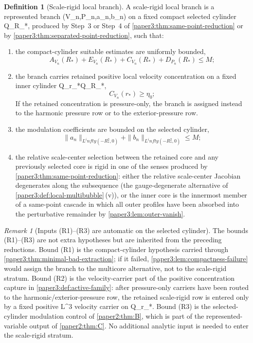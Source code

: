\documentclass[11pt]{amsart}
\def\({}%
\def\){}%
\def\infty{infty}%
\theoremstyle{plain}
\theoremstyle{definition}
\newtheorem{definition}[definition]{Definition}
\theoremstyle{remark}
\newtheorem{remark}[remark]{Remark}
\begin{document}
\begin{definition}[Scale-rigid local branch]
\label{paper3:def:scale-rigid-branch}
A scale-rigid local branch is a represented branch
\((V_n,P_n,a_n,b_n)\) on a fixed compact selected cylinder \(Q_{R_*}\),
produced by Step~3 or Step~4 of \cref{paper3:thm:same-point-reduction} or by
\cref{paper3:thm:separated-point-reduction}, such that:
\begin{enumerate}[label=\textup{(R\arabic*)}]
\item the compact-cylinder suitable estimates are uniformly bounded,
      \[
        A_{V_n}(R_*)+E_{V_n}(R_*)+C_{V_n}(R_*)+D_{P_n}(R_*)\le M;
      \]
\item the branch carries retained positive local velocity concentration on a fixed inner
      cylinder \(Q_{r_*}\Subset Q_{R_*}\),
      \[
        C_{V_n}(r_*)\ge\eta_0;
      \]
      If the retained concentration is pressure-only, the branch is assigned
      instead to the harmonic pressure row or to the exterior-pressure row.
\item the modulation coefficients are bounded on the selected cylinder,
      \[
        \|a_n\|_{L^\infty(-R_*^2,0)}+\|b_n\|_{L^\infty(-R_*^2,0)}\le M;
      \]
\item the relative scale-center selection between the retained core and any
      previously selected core is rigid in one of the senses produced by
      \cref{paper3:thm:same-point-reduction}: either the relative
      scale-center Jacobian degenerates along the subsequence (the
      gauge-degenerate alternative of
      \cref{paper3:def:local-multibubble}\,(v)), or the inner core is the
      innermost member of a same-point cascade in which all outer profiles
      have been absorbed into the perturbative remainder by
      \cref{paper3:lem:outer-vanish}.
\end{enumerate}
\end{definition}

\begin{remark}[Inputs (R1)--(R3) are automatic on the selected cylinder]
\label{paper3:rem:scale-rigid-inputs-automatic}
The bounds (R1)--(R3) are not extra hypotheses but are inherited from the
preceding reductions.  Bound (R1) is the compact-cylinder hypothesis carried
through \cref{paper3:thm:minimal-bad-extraction}; if it failed,
\cref{paper3:lem:compactness-failure} would assign the branch to the
multicore alternative, not to the scale-rigid stratum.  Bound (R2) is the
velocity-carrier part of the positive concentration capture in
\cref{paper3:def:active-family}: after pressure-only carriers have been routed
to the harmonic/exterior-pressure row, the retained scale-rigid row is entered
only by a fixed positive \(L^3\) velocity carrier on \(Q_{r_*}\).  Bound (R3)
is the selected-cylinder modulation control of
\cref{paper2:thm:B}, which is part of the represented-variable output of
\cref{paper2:thm:C}.  No additional analytic input is needed to enter the
scale-rigid stratum.
\end{remark}
\end{document}

